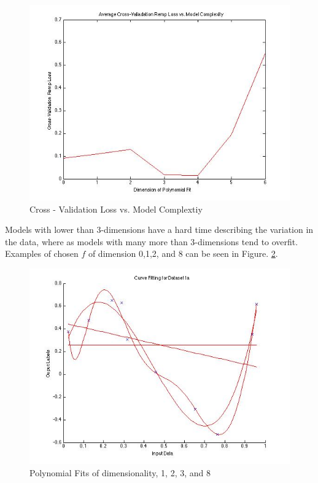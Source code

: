 \documentclass[paper=a4, fontsize=11pt]{scrartcl} %
\begin{document}
\begin{figure}
\centering
\includegraphics[scale=0.4]{Prob1_CrossValError.jpg}
\caption{Cross - Validation Loss vs. Model Complextiy}
\label{fig:Prob1_cross_val}
\end{figure}

Models with lower than 3-dimensions have a hard time describing the variation in the data, where as models with many more than 3-dimensions tend to overfit. Examples of chosen $f$ of dimension 0,1,2, and 8 can be seen in Figure. \ref{fig:manyplots}.

\begin{figure}
\centering
\includegraphics[scale=0.4]{manyplots.jpg}
\caption{Polynomial Fits of dimensionality, 1, 2, 3, and 8}
\label{fig:manyplots}
\end{figure}
\end{document}
